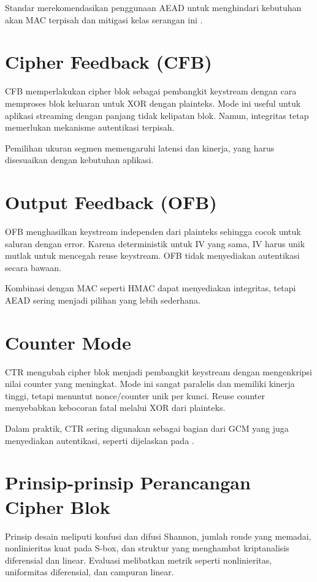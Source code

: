 \documentclass[../main.tex]{subfiles}
\begin{document}
Standar merekomendasikan penggunaan AEAD untuk menghindari kebutuhan akan MAC terpisah dan mitigasi kelas serangan ini \parencite{nist80038d}.

\section{Cipher Feedback (CFB)}
CFB memperlakukan cipher blok sebagai pembangkit keystream dengan cara memproses blok keluaran untuk XOR dengan plainteks. Mode ini useful untuk aplikasi streaming dengan panjang tidak kelipatan blok. Namun, integritas tetap memerlukan mekanisme autentikasi terpisah.

Pemilihan ukuran segmen memengaruhi latensi dan kinerja, yang harus disesuaikan dengan kebutuhan aplikasi.

\section{Output Feedback (OFB)}
OFB menghasilkan keystream independen dari plainteks sehingga cocok untuk saluran dengan error. Karena deterministik untuk IV yang sama, IV harus unik mutlak untuk mencegah reuse keystream. OFB tidak menyediakan autentikasi secara bawaan.

Kombinasi dengan MAC seperti HMAC dapat menyediakan integritas, tetapi AEAD sering menjadi pilihan yang lebih sederhana.

\section{Counter Mode}
CTR mengubah cipher blok menjadi pembangkit keystream dengan mengenkripsi nilai counter yang meningkat. Mode ini sangat paralelis dan memiliki kinerja tinggi, tetapi menuntut nonce/counter unik per kunci. Reuse counter menyebabkan kebocoran fatal melalui XOR dari plainteks.

Dalam praktik, CTR sering digunakan sebagai bagian dari GCM yang juga menyediakan autentikasi, seperti dijelaskan pada \textcite{nist80038d}.

\section{Prinsip-prinsip Perancangan Cipher Blok}
Prinsip desain meliputi konfusi dan difusi Shannon, jumlah ronde yang memadai, nonlinieritas kuat pada S-box, dan struktur yang menghambat kriptanalisis diferensial dan linear. Evaluasi melibatkan metrik seperti nonlinieritas, uniformitas diferensial, dan campuran linear.
\end{document}
